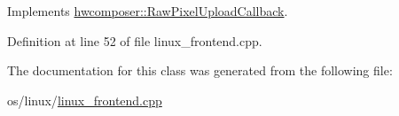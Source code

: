 Implements \mbox{\hyperlink{classhwcomposer_1_1RawPixelUploadCallback_a37aa7f3e3a5b5e9b43d1a11f56806979}{hwcomposer\+::\+Raw\+Pixel\+Upload\+Callback}}.



Definition at line 52 of file linux\+\_\+frontend.\+cpp.


\begin{DoxyCode}{0}
\end{DoxyCode}


The documentation for this class was generated from the following file\+:\begin{DoxyCompactItemize}
\item 
os/linux/\mbox{\hyperlink{linux__frontend_8cpp}{linux\+\_\+frontend.\+cpp}}\end{DoxyCompactItemize}
